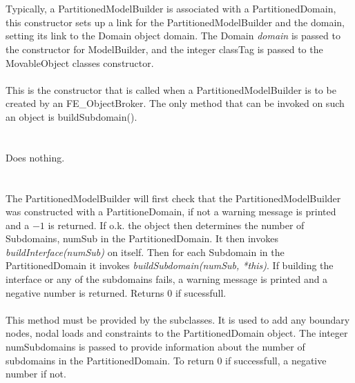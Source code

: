  \\ 
\\  
Typically, a PartitionedModelBuilder is associated with a PartitionedDomain,
this constructor sets up a link for the PartitionedModelBuilder and the domain,
setting its link to the Domain object \p domain. The Domain {\em
domain} is passed to the constructor for ModelBuilder, and the integer
\p classTag is passed to the MovableObject classes constructor. \\

\\  
This is the constructor that is called when a PartitionedModelBuilder
is to be created by an FE\_ObjectBroker. The only method that can be
invoked on such an object is buildSubdomain(). \\

 \\
\\ 
Does nothing. \\


 \\
 \\
The PartitionedModelBuilder will first check that the
PartitionedModelBuilder was constructed with a PartitioneDomain, if
not a warning message is printed and a $-1$ is returned. If o.k. the object 
then determines the number of Subdomains, \p numSub in the
PartitionedDomain. It then invokes {\em buildInterface(numSub)} on 
itself. Then for each Subdomain in the PartitionedDomain it invokes
{\em buildSubdomain(numSub, *this)}. If building the interface or any
of the subdomains fails, a warning message is printed and a negative
number is returned. Returns $0$ if sucessfull. \\

\\ 
This method must be provided by the subclasses. It is used to add any
boundary nodes, nodal loads and constraints to the PartitionedDomain
object. The integer \p numSubdomains is passed to provide
information about the number of subdomains in the
PartitionedDomain. To return $0$ if successfull, a negative number if not. \\


